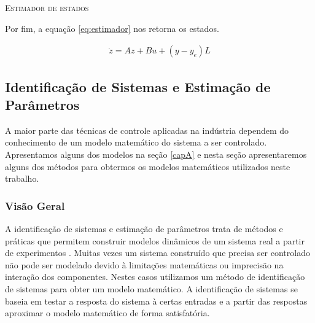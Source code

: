 \IncMargin{1em}
\begin{algorithm}[H]
	
	\label{alg:ee}
	\caption{\textsc{Estimador de estados}}
\end{algorithm}
\DecMargin{1em}

Por fim, a equação \ref{eq:estimador} nos retorna os estados.

\begin{equation}\label{eq:estimador}
\begin{matrix}
\dot{z}=Az+Bu+(y-y_e)L
\end{matrix}
\end{equation}

\subsection{Identificação de Sistemas e Estimação de Parâmetros}
A maior parte das técnicas de controle aplicadas na indústria dependem do conhecimento de um modelo matemático do sistema a ser controlado. Apresentamos alguns dos modelos na seção \ref{capA} e nesta seção apresentaremos alguns dos métodos para obtermos os modelos matemáticos utilizados neste trabalho.


\subsubsection{Visão Geral}
A identificação de sistemas e estimação de parâmetros trata de métodos e práticas que permitem construir modelos dinâmicos de um sistema real a partir de experimentos . Muitas vezes um sistema construído que precisa ser controlado não pode ser modelado devido à limitações matemáticas ou imprecisão na interação dos componentes. Nestes casos utilizamos um método de identificação de sistemas para obter um modelo matemático. A identificação de sistemas se baseia em testar a resposta do sistema à certas entradas e a partir das respostas aproximar o modelo matemático de forma satisfatória.

